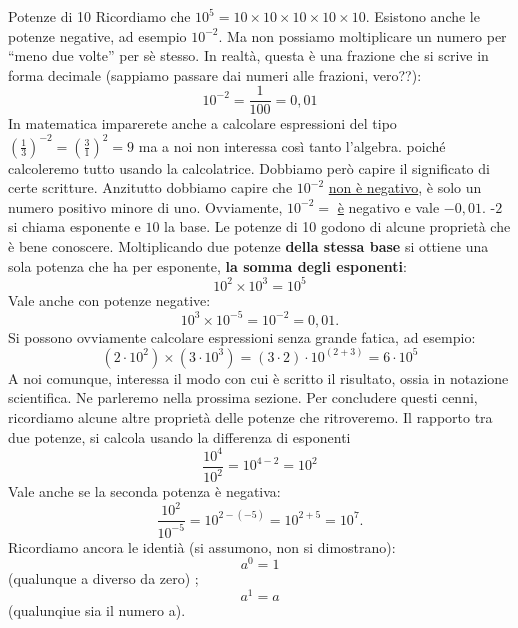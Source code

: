 \documentclass[12pt,a4paper,oneside]{book}
\makeatletter
\renewcommand{\subsection}{\@startsection {subsection}{2}{\z@}
{-3ex \@plus -0.1ex \@minus -.4ex}
{0.5ex \@plus.2ex }
{\color[rgb]{0.141,0.596,0.749}\normalfont\sffamily\bfseries}}
\theoremstyle{esercizio}
\makeatother
\begin{document}
\subsection{Potenze di 10}
Ricordiamo che $10^5=10\times 10 \times 10\times 10\times10$. Esistono anche le potenze negative, ad esempio $10^{-2}$. Ma non possiamo moltiplicare un numero per ``meno due volte'' per sè stesso. In realtà, questa è una frazione che si scrive in forma decimale (sappiamo passare dai numeri alle frazioni, vero??):
\[
10^{-2}=\frac{1}{100} = 0,01
\]
In matematica imparerete anche a calcolare espressioni del tipo $\left(\frac{1}{3}\right)^{-2} =\left(\frac{3}{1}\right)^{2} = 9$ ma a noi non interessa così tanto l'algebra. poiché calcoleremo tutto usando la calcolatrice. Dobbiamo però capire il significato di certe scritture. Anzitutto dobbiamo capire che $10^{-2}$ \underline{non è negativo}, è solo un numero positivo minore di uno. Ovviamente, $10^{-2}=$ \underline{è} negativo e vale $-0,01$. -$2$ si chiama esponente  e $10$ la base. Le potenze di 10 godono di alcune proprietà che è bene conoscere. Moltiplicando due potenze \textbf{della stessa base} si ottiene una sola potenza che ha per esponente, \textbf{la somma degli esponenti}:
\[
10^2\times 10^3 = 10^5
\]
Vale anche con potenze negative:
\[
10^3\times10^{-5} = 10^{-2} = 0,01.
\]
Si possono ovviamente calcolare espressioni senza grande fatica, ad esempio:
\[
\left( 2 \cdot 10^2 \right) \times \left( 3 \cdot 10^3 \right) = \left( 3 \cdot 2 \right) \cdot 10^{(2+3)} = 6 \cdot 10^5
\]
A noi comunque, interessa il modo con cui è scritto il risultato, ossia  in notazione scientifica. Ne parleremo nella prossima sezione. Per concludere questi cenni, ricordiamo alcune altre proprietà delle potenze che ritroveremo. Il rapporto tra due potenze, si calcola usando la differenza di esponenti
\[
\frac{10^4}{10^2}=10^{4-2} = 10^2
\]
Vale anche se la seconda potenza è negativa:
\[
\frac{10^2}{10^{-5}}=10^{2-(-5)} = 10^{2+5} = 10^7.
\]
Ricordiamo ancora le identià (si assumono, non si dimostrano): $$a^0 =1 $$ (qualunque a diverso da zero)  ; $$a^1 = a$$ (qualunqiue sia il numero a).  
\end{document}
